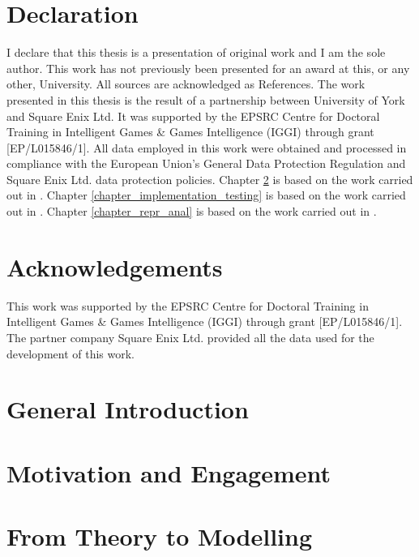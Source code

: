 \documentclass{yorkThesis}
\begin{document}
\chapter*{Declaration}
\label{declaration}
I declare that this thesis is a presentation of original work and I am the sole author. This work has not previously been presented for an award at this, or any other, University. All sources are acknowledged as References. The work presented in this thesis is the result of a partnership between University of York and Square Enix Ltd. It was supported by the EPSRC Centre for Doctoral Training in Intelligent Games \& Games Intelligence (IGGI) through grant [EP/L015846/1]. All data employed in this work were obtained and processed in compliance with the European Union's General Data Protection Regulation \cite{EUdataregulations2018} and Square Enix Ltd. data protection policies. Chapter \ref{chapter_theory_modelling} is based on the work carried out in \cite{bonometti2020theory, bonometti2021approximating}. Chapter \ref{chapter_implementation_testing} is based on the work carried out in \cite{bonometti2019modelling, bonometti2020theory, bonometti2021approximating}. Chapter \ref{chapter_repr_anal} is based on the work carried out in \cite{bonometti2021approximating}.

\chapter*{Acknowledgements}
\label{acknowledgements}
This work was supported by the EPSRC Centre for Doctoral Training in Intelligent Games \& Games Intelligence (IGGI) through grant [EP/L015846/1]. The partner company Square Enix Ltd. provided all the data used for the development of this work.

\chapter*{General Introduction}
\label{chapter_general_intro}


\tableofcontents


\chapter{Motivation and Engagement}
\label{chapter_lit_review}


\chapter{From Theory to Modelling}
\label{chapter_theory_modelling}

\end{document}
